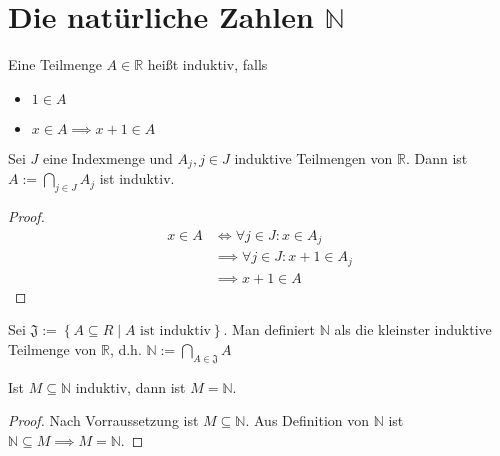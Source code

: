 \chapter{Die natürliche Zahlen $\mathbb{N}$}
\begin{definition}
  Eine Teilmenge $A \in \mathbb{R}$ heißt induktiv, falls
  \begin{itemize}
  \item $1 \in A$
  \item $x \in A \implies x+1 \in A$
  \end{itemize}
\end{definition}
\begin{observation}
  Sei $J$ eine Indexmenge und $A_j, j \in J$ induktive Teilmengen von $\mathbb{R}$. Dann ist $A := \bigcap_{j \in J} A_j$ ist induktiv.
  \begin{proof}
    \begin{align*}
      x \in A &\iff \forall j \in J: x \in A_j \\
      \,&\implies \forall j \in J: x+1 \in A_j \\
      \,&\implies x+1 \in A
    \end{align*}
  \end{proof}
\end{observation}
\begin{definition}
  Sei $\mathfrak{J} := \left\{ A \subseteq R \middle| A \text{ ist induktiv} \right\}$. Man definiert $\mathbb{N}$ als die kleinster induktive Teilmenge von $\mathbb{R}$, d.h. $\mathbb{N} := \bigcap_{A \in \mathfrak{J}} A$
\end{definition}

\begin{theorem}[Induktionsprinzip]
  Ist $M \subseteq \mathbb{N}$ induktiv, dann ist $M = \mathbb{N}$.
\end{theorem}
\begin{proof}
  Nach Vorraussetzung ist $M \subseteq \mathbb{N}$. Aus Definition von $\mathbb{N}$ ist $\mathbb{N} \subseteq M \implies M = \mathbb{N}$.
\end{proof}